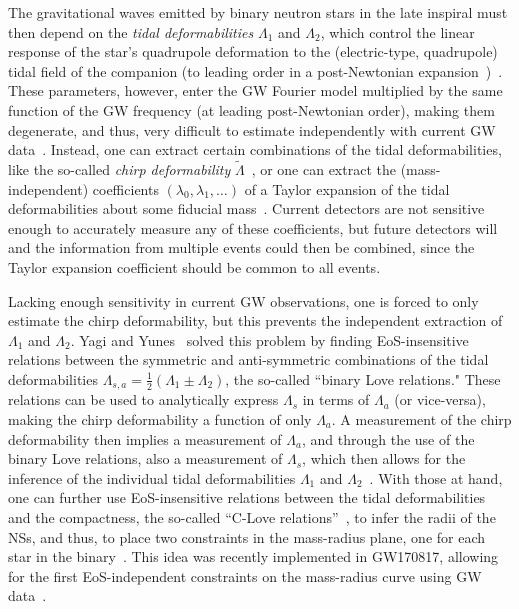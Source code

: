 \documentclass[prd,twocolumn,nofootinbib,superscriptaddress,amsmath,amssymb]{revtex4-1}
\begin{document}
The gravitational waves emitted by binary neutron stars in the late inspiral must then depend on the \emph{tidal deformabilities} $\Lambda_1$ and $\Lambda_2$, which control the linear response of the star's quadrupole deformation to the (electric-type, quadrupole) tidal field of the companion (to leading order in a post-Newtonian expansion~\cite{Blanchet:2013haa})~\cite{Flanagan2008,Vines:2011ud}. These parameters, however, enter the GW Fourier model multiplied by the same function of the GW frequency (at leading post-Newtonian order), making them degenerate, and thus, very difficult to estimate independently with current GW data~\cite{Wade:tidalCorrections}. Instead, one can extract certain combinations of the tidal deformabilities, like the so-called \emph{chirp deformability} $\tilde{\Lambda}$~\cite{Favata:2013rwa,Wade:tidalCorrections}, or one can extract the (mass-independent) coefficients $(\lambda_{0},\lambda_{1},\ldots)$ of a Taylor expansion of the tidal deformabilities about some fiducial mass~\cite{delPozzo:TaylorTidal,Yagi:binLove}. Current detectors are not sensitive enough to accurately measure any of these coefficients, but future detectors will and the information from multiple events could then be combined, since the Taylor expansion coefficient should be common to all events. 

Lacking enough sensitivity in current GW observations, one is forced to only estimate the chirp deformability, but this prevents the independent extraction of $\Lambda_{1}$ and $\Lambda_{2}$. Yagi and Yunes~\cite{Yagi:binLove} solved this problem by finding EoS-insensitive relations between the symmetric and anti-symmetric combinations of the tidal deformabilities $\Lambda_{s,a}=\frac{1}{2}(\Lambda_1 \pm \Lambda_2)$, the so-called ``binary Love relations." These relations can be used to analytically express $\Lambda_{s}$ in terms of $\Lambda_{a}$ (or vice-versa), making the chirp deformability a function of only $\Lambda_{a}$. A measurement of the chirp deformability then implies a measurement of $\Lambda_{a}$, and through the use of the binary Love relations, also a measurement of $\Lambda_{s}$, which then allows for the inference of the individual tidal deformabilities $\Lambda_{1}$ and $\Lambda_{2}$~\cite{Yagi:binLove}. With those at hand, one can further use EoS-insensitive relations between the tidal deformabilities and the compactness, the so-called ``C-Love relations''~\cite{Yagi:ILQ}, to infer the radii of the NSs, and thus, to place two constraints in the mass-radius plane, one for each star in the binary~\cite{Yagi:binLove}. This idea was recently implemented in GW170817, allowing for the first EoS-independent constraints on the mass-radius curve using GW data~\cite{LIGO:posterior}.     
\end{document}
